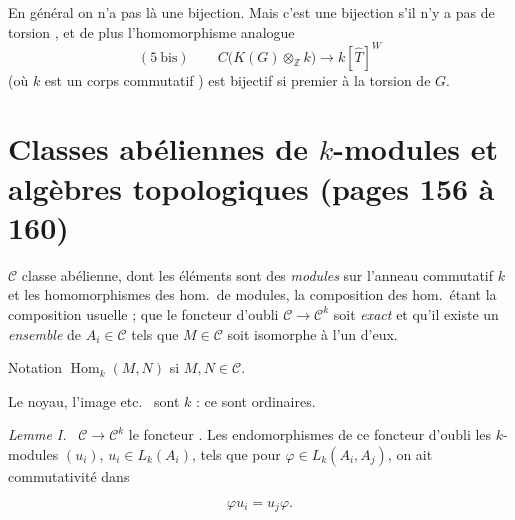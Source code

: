 \documentclass[11pt,a4paper]{article}
\begin{document}
 En général \struck{\ill{}} on n'a pas là une bijection. Mais c'est
 une bijection s'il n'y a pas de torsion \struck{\ill{}}, et de
plus l'homomorphisme analogue
\[ (5\ \mathrm{bis}) \qquad C\bigl( K(G) \otimes_{\mathbb{Z}} k \bigr)
   \longrightarrow k[\hat{T}]^{W} \]
(où $k$ est un corps commutatif \ill{}) est bijectif si \struck{\ill{}}
 premier à la torsion de $G$.


\section*{Classes abéliennes de $k$-modules et algèbres topologiques (pages 156 à 160)}



$\mathcal{C}$ classe abélienne, \struck{\ill{}} dont les éléments sont des
\emph{modules} sur l'anneau commutatif $k$ et les homomorphismes des hom.\ de
modules, la composition des hom.\ étant la composition usuelle ; \ill{} que le
foncteur d'oubli $\mathcal{C} \to \mathcal{C}^{k}$ soit \emph{exact} et qu'il
existe un \emph{ensemble} de $A_{i} \in \mathcal{C}$ tels que \ill{}
$M \in \mathcal{C}$ soit isomorphe à l'un d'eux.

Notation $\operatorname{Hom}_{k}(M, N)$ si $M, N \in \mathcal{C}$.

Le noyau, l'image etc.\ \ill{} sont $k$ \ill{} : ce sont \ill{} ordinaires.

\marginal{\ill{}}

\emph{Lemme I.} \ $\mathcal{C} \to \mathcal{C}^{k}$ le foncteur \ill{}. Les
endomorphismes de ce foncteur d'oubli \add{\ill{}}
\struck{\ill{}} \ill{} les $k$-modules $(u_{i})$, $u_{i} \in L_{k}(A_{i})$, tels
que pour \ill{} $\varphi \in L_{k}(A_{i}, A_{j})$, on ait commutativité dans


\[ \varphi u_{i} = u_{j} \varphi . \]
\end{document}
